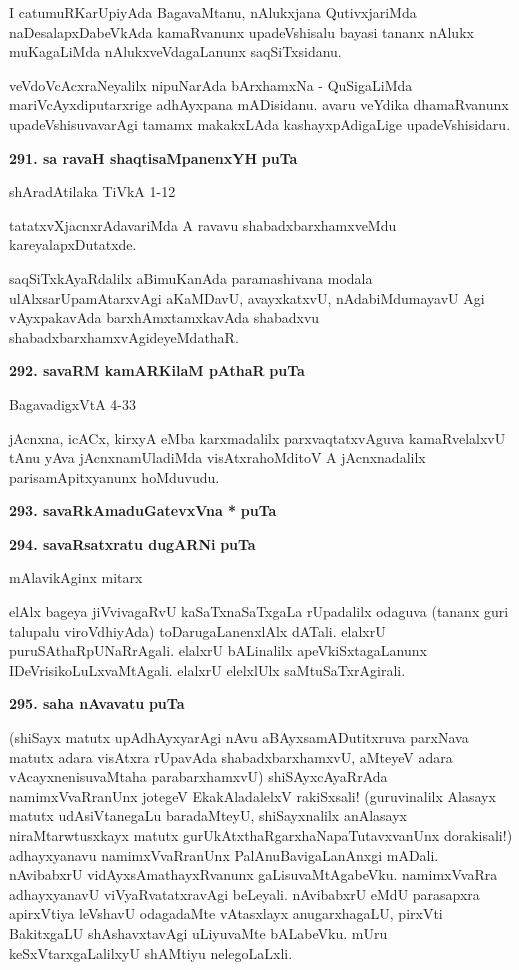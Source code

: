 I catumuRKarUpiyAda BagavaMtanu, nAlukxjana QutivxjariMda naDesalapxDabeVkAda kamaRvanunx upadeVshisalu bayasi tananx nAlukx muKagaLiMda nAlukxveVdagaLanunx saqSiTxsidanu.

veVdoVcAcxraNeyalilx nipuNarAda bArxhamxNa - QuSigaLiMda mariVcAyxdiputarxrige adhAyxpana mADisidanu. avaru veYdika dhamaRvanunx upadeVshisuvavarAgi tamamx makakxLAda kashayxpAdigaLige upadeVshisidaru.


\medskip
\noindent
\textbf{291. sa ravaH shaqtisaMpanenxYH} \hfill {\bf puTa \pageref{151d}}

\hfill shAradAtilaka TiVkA 1-12

\smallskip
tatatxvXjacnxrAdavariMda A ravavu shabadxbarxhamxveMdu kareyalapxDutatxde.

saqSiTxkAyaRdalilx aBimuKanAda paramashivana modala ulAlxsarUpamAtarxvAgi aKaMDavU, avayxkatxvU, nAdabiMdumayavU Agi vAyxpakavAda barxhAmxtamxkavAda shabadxvu shabadxbarxhamxvAgideyeMdathaR.

\noindent
\textbf{292. savaRM kamARKilaM pAthaR} \hfill {\bf puTa \pageref{63d}}

\hfill BagavadigxVtA 4-33

\smallskip
jAcnxna, icACx, kirxyA eMba karxmadalilx parxvaqtatxvAguva kamaRvelalxvU tAnu yAva jAcnxnamUladiMda visAtxrahoMditoV A jAcnxnadalilx parisamApitxyanunx hoMduvudu.

\medskip
\noindent
\textbf{293. savaRkAmaduGatevxVna *} \hfill {\bf puTa \pageref{95}}

\smallskip
\noindent
\textbf{294. savaRsatxratu dugARNi} \hfill {\bf puTa \pageref{244a}}

\hfill mAlavikAginx mitarx

\smallskip
elAlx bageya jiVvivagaRvU kaSaTxnaSaTxgaLa rUpadalilx odaguva (tananx guri talupalu viroVdhiyAda) toDarugaLanenxlAlx dATali. elalxrU puruSAthaRpUNaRrAgali.  elalxrU bALinalilx apeVkiSxtagaLanunx IDeVrisikoLuLxvaMtAgali. elalxrU elelxlUlx saMtuSaTxrAgirali.

\medskip
\noindent
\textbf{295. saha nAvavatu} \hfill {\bf puTa \pageref{46a}}

\smallskip
(shiSayx matutx upAdhAyxyarAgi nAvu aBAyxsamADutitxruva parxNava matutx adara visAtxra rUpavAda shabadxbarxhamxvU, aMteyeV adara vAcayxnenisuvaMtaha parabarxhamxvU) shiSAyxcAyaRrAda namimxVvaRranUnx jotegeV EkakAladalelxV rakiSxsali! (guruvinalilx Alasayx matutx udAsiVtanegaLu baradaMteyU, shiSayxnalilx anAlasayx niraMtarwtusxkayx matutx gurUkAtxthaRgarxhaNapaTutavxvanUnx dorakisali!) adhayxyanavu namimxVvaRranUnx PalAnuBavigaLanAnxgi mADali. nAvibabxrU vidAyxsAmathayxRvanunx gaLisuvaMtAgabeVku. namimxVvaRra adhayxyanavU viVyaRvatatxravAgi beLeyali. nAvibabxrU eMdU parasapxra apirxVtiya leVshavU odagadaMte vAtasxlayx anugarxhagaLU, pirxVti BakitxgaLU shAshavxtavAgi uLiyuvaMte bALabeVku. mUru keSxVtarxgaLalilxyU shAMtiyu nelegoLaLxli.
 
